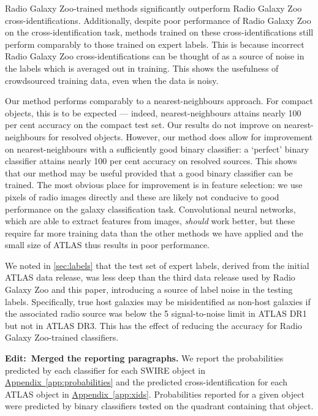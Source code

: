 \documentclass[fleqn,usenatbib,usedcolumn]{mnras}
\newcommand{\edit}[1]{{\bf Edit:~{#1}}}
\newcommand{\aref}[1]{\hyperref[#1]{Appendix~\ref{#1}}}
\begin{document}
    Radio Galaxy Zoo-trained methods significantly outperform Radio Galaxy Zoo cross-identifications. Additionally, despite poor performance of Radio Galaxy Zoo on the cross-identification task, methods trained on these cross-identifications still perform comparably to those trained on expert labels. This is because incorrect Radio Galaxy Zoo cross-identifications can be thought of as a source of noise in the labels which is averaged out in training. This shows the usefulness of crowdsourced training data, even when the data is noisy.

    Our method performs comparably to a nearest-neighbours approach. For compact objects, this is to be expected --- indeed, nearest-neighbours attains nearly 100 per cent accuracy on the compact test set. Our results do not improve on nearest-neighbours for resolved objects. However, our method does allow for improvement on nearest-neighbours with a sufficiently good binary classifier: a `perfect' binary classifier attains nearly 100 per cent accuracy on resolved sources. This shows that our method may be useful provided that a good binary classifier can be trained. The most obvious place for improvement is in feature selection: we use pixels of radio images directly and these are likely not conducive to good performance on the galaxy classification task. Convolutional neural networks, which are able to extract features from images, \emph{should} work better, but these require far more training data than the other methods we have applied and the small size of ATLAS thus results in poor performance.

    We noted in \autoref{sec:labels} that the test set of expert labels, derived from the initial ATLAS data release, was less deep than the third data release used by Radio Galaxy Zoo and this paper, introducing a source of label noise in the testing labels. Specifically, true host galaxies may be misidentified as non-host galaxies if the associated radio source was below the 5 signal-to-noise limit in ATLAS DR1 but not in ATLAS DR3. This has the effect of reducing the accuracy for Radio Galaxy Zoo-trained classifiers.

    \edit{Merged the reporting paragraphs.} We report the probabilities predicted by each classifier for each SWIRE object in \aref{app:probabilities} and the predicted cross-identification for each ATLAS object in \aref{app:xids}. Probabilities reported for a given object were predicted by binary classifiers tested on the quadrant containing that object.
\end{document}
